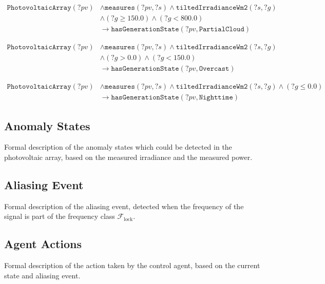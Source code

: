 \begin{equation}
\begin{aligned}
\texttt{PhotovoltaicArray}(?pv) &\wedge \texttt{measures}(?pv, ?s) \wedge \texttt{tiltedIrradianceWm2}(?s, ?g) \\
&\wedge (?g \ge 150.0) \wedge (?g < 800.0) \\
&\longrightarrow \texttt{hasGenerationState}(?pv, \texttt{PartialCloud})
\end{aligned}
\end{equation}

\begin{equation}
\begin{aligned}
\texttt{PhotovoltaicArray}(?pv) &\wedge \texttt{measures}(?pv, ?s) \wedge \texttt{tiltedIrradianceWm2}(?s, ?g) \\
&\wedge (?g > 0.0) \wedge (?g < 150.0) \\
&\longrightarrow \texttt{hasGenerationState}(?pv, \texttt{Overcast})
\end{aligned}
\end{equation}

\begin{equation}
\begin{aligned}
\texttt{PhotovoltaicArray}(?pv) &\wedge \texttt{measures}(?pv, ?s) \wedge \texttt{tiltedIrradianceWm2}(?s, ?g) \wedge (?g \le 0.0) \\
&\longrightarrow \texttt{hasGenerationState}(?pv, \texttt{Nighttime})
\end{aligned}
\end{equation}

\subsection{Anomaly States}
Formal description of the anomaly states which could be detected in the photovoltaic array, based on the measured irradiance and the measured power.

\subsection{Aliasing Event} 
Formal description of the aliasing event, detected when the frequency of the signal is part of the frequency class $\mathcal{F}_{\mathrm{lock}}$.

\subsection{Agent Actions}
Formal description of the action taken by the control agent, based on the current state and aliasing event.